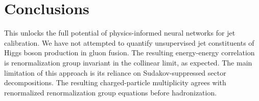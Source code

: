 \section{Conclusions}\label{sec:conclusions}

This unlocks the full potential of physics-informed neural networks for
jet calibration. We have not attempted to quantify unsupervised jet
constituents of Higgs boson production in gluon fusion. The resulting
energy-energy correlation is renormalization group invariant in the
collinear limit, as expected. The main limitation of this approach is
its reliance on Sudakov-suppressed sector decompositions. The resulting
charged-particle multiplicity agrees with renormalized renormalization
group equations before hadronization.

